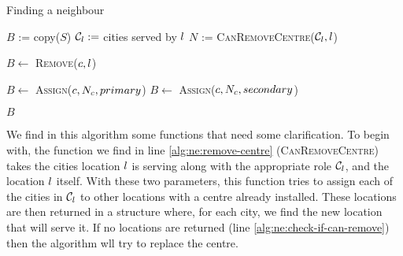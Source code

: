 \begin{algorithm}[H]
    \label{alg:find-neighbour}
    \DontPrintSemicolon
    
    \caption{Finding a neighbour}
    
     {
        $B$ :=  copy($S$)\;
        $\mathcal{C}_{l} := $ cities served by $l$\;
        $N$ := \textsc{CanRemoveCentre($\mathcal{C}_{l}, l$)}
            \label{alg:ne:remove-centre}\;
            
         { \label{alg:ne:check-if-can-remove}
            \For {$\icity \in \city_{\iloc}$} {
                $B \leftarrow$ \textsc{Remove}($c, l$)
                    \label{alg:ne:remove-assignation}\;
                
                 {
                    $B \leftarrow$ \textsc{Assign}($c, N_{c}, primary$)
                        \label{alg:ne:new-assignation-1}
                }
                 {
                    $B \leftarrow$ \textsc{Assign}($c, N_{c}, secondary$)
                        \label{alg:ne:new-assignation-2}
                }
            }
        }
        \Return $B$
    }
\end{algorithm}

\hfill

We find in this algorithm some functions that need some clarification. To begin with, the
function we find in line \ref{alg:ne:remove-centre} (\textsc{CanRemoveCentre}) takes the
cities location $l$ is serving along with the appropriate role $\mathcal{C}_l$, and the
location $l$ itself. With these two parameters, this function tries to assign each of
the cities in $\mathcal{C}_l$ to other locations with a centre already installed. These
locations are then returned in a structure where, for each city, we find the new location
that will serve it. If no locations are returned (line \ref{alg:ne:check-if-can-remove})
then the algorithm wll try to replace the centre.

